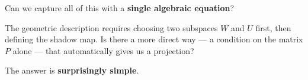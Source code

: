 \documentclass[10pt]{beamer}
\theoremstyle{definition}
\newcommand{\x}[1]{\alert{\textbf{#1}}}
\begin{document}
\begin{frame}{}

\vspace{2em}

\begin{center}
{\Large Can we capture all of this with a \x{single algebraic equation}?}
\end{center}

\vspace{2em}

{\small
The geometric description requires choosing two subspaces $W$ and $U$ first, then defining the shadow map. Is there a more direct way --- a condition on the matrix $P$ alone --- that automatically gives us a projection?

\vspace{0.5em}

The answer is \x{surprisingly simple}.
}

\end{frame}
\end{document}
